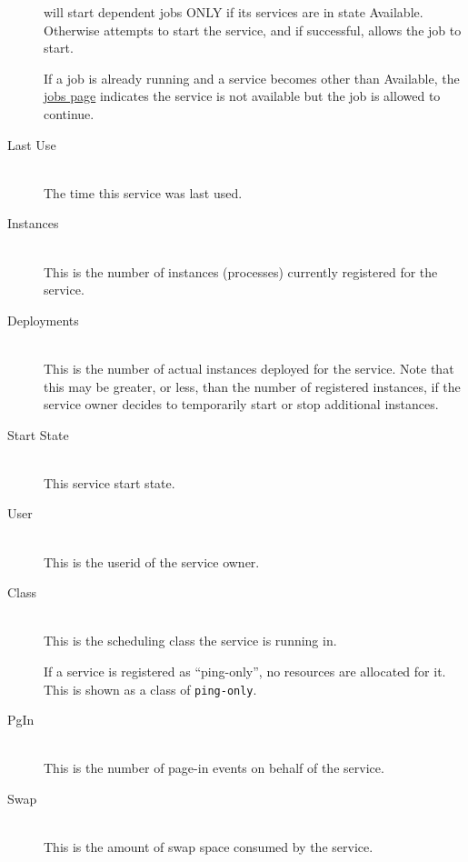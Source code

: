 \begin{description}
              {\DUCC} will start dependent jobs ONLY if its services are in state Available.  Otherwise
              {\DUCC} attempts to start the service, and if successful, allows the job to start.  

              If a job is already running and a service becomes other than Available, the
              \hyperref[sec:ws.jobs-page]{jobs page} indicates the service is not available but the job is 
              allowed to continue.
              
            \item[Last Use] \hfill \\
              The time this service was last used.
              
            \item[Instances] \hfill \\
              This is the number of instances (processes) currently registered for the service.  

            \item[Deployments] \hfill \\
              This is the number of actual instances deployed for the service.  Note that this may
              be greater, or less, than the number of registered instances, if the service owner
              decides to temporarily start or stop additional instances.

            \item[Start State] \hfill \\
              This service start state.

            \item[User] \hfill \\
              This is the userid of the service owner.
              
            \item[Class] \hfill \\
              This is the scheduling class the service is running in. 
              
              If a service is registered as ``ping-only'', no resources are allocated for it.  This
              is shown as a class of {\tt ping-only}.
                
      		\item[PgIn] \hfill \\
        	This is the number of page-in events on behalf of the service.

      		\item[Swap] \hfill \\
        	This is the amount of swap space consumed by the service.
        

\end{description}
